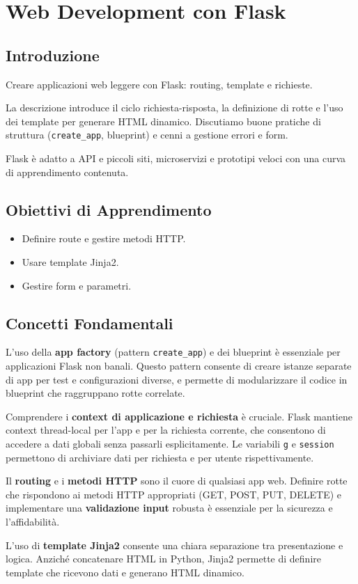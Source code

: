 \chapter{Web Development con Flask}

\section{Introduzione}
Creare applicazioni web leggere con Flask: routing, template e richieste.

La descrizione introduce il ciclo richiesta-risposta, la definizione di rotte e l'uso dei template per generare HTML dinamico. Discutiamo buone pratiche di struttura (\texttt{create\_app}, blueprint) e cenni a gestione errori e form.

Flask è adatto a API e piccoli siti, microservizi e prototipi veloci con una curva di apprendimento contenuta.

\section{Obiettivi di Apprendimento}
\begin{itemize}
  \item Definire route e gestire metodi HTTP.
  \item Usare template Jinja2.
  \item Gestire form e parametri.
\end{itemize}

\section{Concetti Fondamentali}
\begin{tcolorbox}[title=Struttura di app e ciclo richiesta]
L'uso della \textbf{app factory} (pattern \texttt{create\_app}) e dei blueprint è essenziale per applicazioni Flask non banali. Questo pattern consente di creare istanze separate di app per test e configurazioni diverse, e permette di modularizzare il codice in blueprint che raggruppano rotte correlate.

Comprendere i \textbf{context di applicazione e richiesta} è cruciale. Flask mantiene context thread-local per l'app e per la richiesta corrente, che consentono di accedere a dati globali senza passarli esplicitamente. Le variabili \texttt{g} e \texttt{session} permettono di archiviare dati per richiesta e per utente rispettivamente.

Il \textbf{routing} e i \textbf{metodi HTTP} sono il cuore di qualsiasi app web. Definire rotte che rispondono ai metodi HTTP appropriati (GET, POST, PUT, DELETE) e implementare una \textbf{validazione input} robusta è essenziale per la sicurezza e l'affidabilità.

L'uso di \textbf{template Jinja2} consente una chiara separazione tra presentazione e logica. Anziché concatenare HTML in Python, Jinja2 permette di definire template che ricevono dati e generano HTML dinamico.
\end{tcolorbox}

